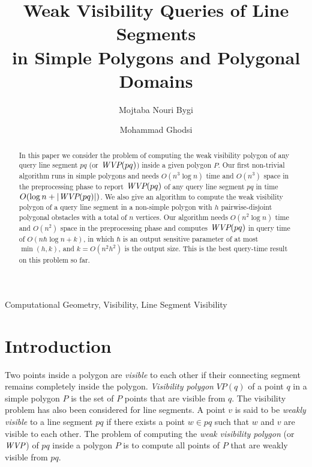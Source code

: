 \documentclass[5p]{elsarticle}
\def\WVP{\mbox{\it{WVP}}}
\def\P{\mbox{${P}$}}
\begin{document}
\title{Weak Visibility Queries of Line Segments \\ in Simple Polygons and Polygonal Domains}


\author[add1]{Mojtaba Nouri Bygi}
\author[add1,add2]{Mohammad Ghodsi}

\address[add1]{Computer Engineering Department, Sharif University of Technology, Iran}
\address[add2]{School of Computer Science, Institute for Research in Fundamental Sciences (IPM), Iran}

  \begin{abstract}
In this paper we consider the problem of computing 
the weak visibility polygon of any query line segment $pq$ (or $\WVP(pq)$) inside a given 
polygon $\P$. Our first non-trivial algorithm runs in simple polygons
and needs $O(n^3 \log n)$ time and $O(n^3)$ space in the preprocessing phase to 
report $\WVP(pq)$ of any query line segment $pq$ in time $O(\log n + |\WVP(pq)|)$.
We also give an algorithm to compute the weak visibility
polygon of a query line segment in a non-simple polygon with $h$ pairwise-disjoint polygonal obstacles 
with a total of $n$ vertices. Our algorithm needs $O(n^2 \log n)$ time and $O(n^2)$ 
space in the preprocessing phase and computes $\WVP(pq)$ in query time of $O(n\hbar \log n + k)$, in which
$\hbar$ is an output sensitive parameter of at most $\min(h,k)$,
and $k = O(n^2h^2)$ is the output size. This is the best query-time result 
on this problem so far.
\end{abstract}
\begin{keyword}
Computational Geometry, Visibility, Line Segment Visibility
\end{keyword}

\maketitle

  
  
\section{Introduction \label{sec:intro}}

Two points inside a polygon are {\em visible} to each other if their connecting segment remains
completely inside the polygon. {\em Visibility polygon} $VP(q)$ of a point
$q$ in a simple polygon $\P$ is the set of $\P$ points that are visible from $q$. 
The visibility problem has also been considered for line segments.
A point $v$ is said to be {\em weakly visible} to a line segment $pq$ if there exists
a point $w \in pq$ such that $w$ and $v$ are visible to each other.
The problem of computing the {\em weak visibility polygon} (or $\WVP$) of $pq$ inside a polygon $\P$ is 
to compute all points of $\P$ that are weakly visible from $pq$.
\end{document}
